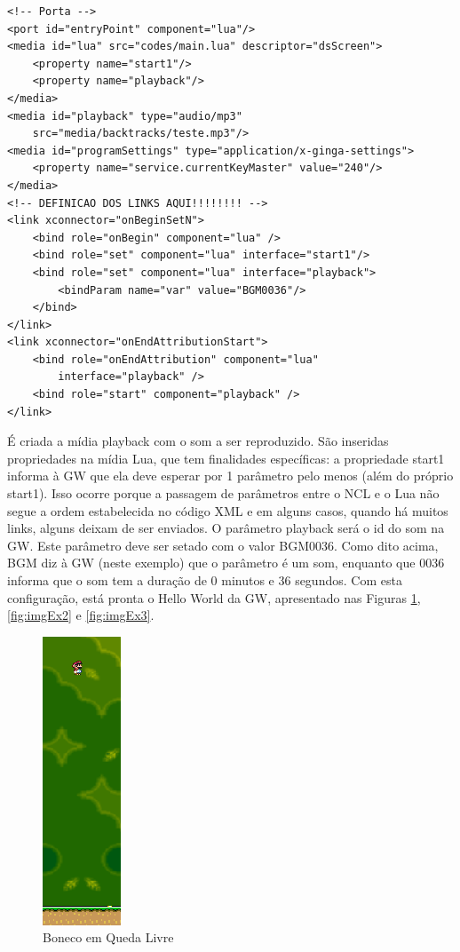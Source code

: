 \documentclass[
	12pt,				%
	openright,			%
	oneside,			%
	a4paper,			%
	brazil,				%
	]{abntex2}
\begin{document}
\begin{lstlisting}[caption={Portas, Medias e Links},label=cod_ex_8,frame=single]
<!-- Porta -->
<port id="entryPoint" component="lua"/>
<media id="lua" src="codes/main.lua" descriptor="dsScreen">
    <property name="start1"/>
    <property name="playback"/>
</media>
<media id="playback" type="audio/mp3" 
	src="media/backtracks/teste.mp3"/>
<media id="programSettings" type="application/x-ginga-settings">
    <property name="service.currentKeyMaster" value="240"/>
</media>
<!-- DEFINICAO DOS LINKS AQUI!!!!!!!! -->
<link xconnector="onBeginSetN">
    <bind role="onBegin" component="lua" />
    <bind role="set" component="lua" interface="start1"/>
    <bind role="set" component="lua" interface="playback">
        <bindParam name="var" value="BGM0036"/>                
    </bind>
</link>
<link xconnector="onEndAttributionStart">
    <bind role="onEndAttribution" component="lua" 
    	interface="playback" />
    <bind role="start" component="playback" />
</link>
\end{lstlisting}

É criada a mídia playback com o som a ser reproduzido. São inseridas propriedades na mídia Lua, que tem finalidades específicas: a propriedade start1 informa à GW que ela deve esperar por 1 parâmetro pelo menos (além do próprio start1). Isso ocorre porque a passagem de parâmetros entre o NCL e o Lua não segue a ordem estabelecida no código XML e em alguns casos, quando há muitos links, alguns deixam de ser enviados. O parâmetro playback será o id do som na GW. Este parâmetro deve ser setado com o valor BGM0036. Como dito acima, BGM diz à GW (neste exemplo) que o parâmetro é um som, enquanto que 0036 informa que o som tem a duração de 0 minutos e 36 segundos. Com esta configuração, está pronta o Hello World da GW, apresentado nas Figuras \ref{fig:imgEx1}, \ref{fig:imgEx2} e \ref{fig:imgEx3}.

\begin{figure}
\centering
\includegraphics{img_ex_1.png}
\caption{Boneco em Queda Livre}
\label{fig:imgEx1}
\end{figure}
\end{document}
